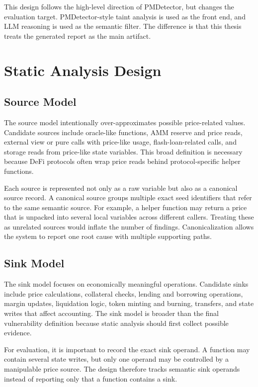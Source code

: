 This design follows the high-level direction of PMDetector, but changes the
evaluation target. PMDetector-style taint analysis is used as the front end, and
LLM reasoning is used as the semantic filter. The difference is that this
thesis treats the generated report as the main artifact.

\section{Static Analysis Design}

\subsection{Source Model}

The source model intentionally over-approximates possible price-related values.
Candidate sources include oracle-like functions, AMM reserve and price reads,
external view or pure calls with price-like usage, flash-loan-related calls,
and storage reads from price-like state variables. This broad definition is
necessary because DeFi protocols often wrap price reads behind protocol-specific
helper functions.

Each source is represented not only as a raw variable but also as a canonical
source record. A canonical source groups multiple exact seed identifiers that
refer to the same semantic source. For example, a helper function may return a
price that is unpacked into several local variables across different callers.
Treating these as unrelated sources would inflate the number of findings.
Canonicalization allows the system to report one root cause with multiple
supporting paths.

\subsection{Sink Model}

The sink model focuses on economically meaningful operations. Candidate sinks
include price calculations, collateral checks, lending and borrowing operations,
margin updates, liquidation logic, token minting and burning, transfers, and
state writes that affect accounting. The sink model is broader than the final
vulnerability definition because static analysis should first collect possible
evidence.

For evaluation, it is important to record the exact sink operand. A function may
contain several state writes, but only one operand may be controlled by a
manipulable price source. The design therefore tracks semantic sink operands
instead of reporting only that a function contains a sink.

